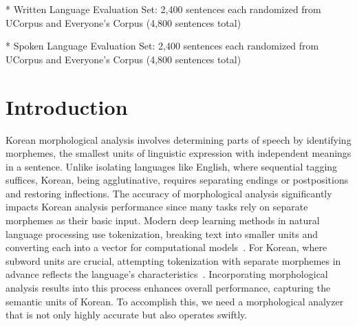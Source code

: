 \documentclass[AMS,STIX2COL]{WileyNJD-v2}
\begin{document}
\begin{table}[ht]
\begin{tabular*}{500pt}{@{\extracolsep\fill}cccD{.}{.}{3}c@{\extracolsep\fill}}
            \bottomrule
        \end{tabular*}
        \begin{tablenotes}
            \footnotesize
            \item\hspace{2mm} * Written Language Evaluation Set: 2,400 sentences each randomized from UCorpus and Everyone's Corpus (4,800 sentences total)
            \item\hspace{2mm} * Spoken Language Evaluation Set: 2,400 sentences each randomized from UCorpus and Everyone's Corpus (4,800 sentences total)
        \end{tablenotes}
    \end{table}

    \section{Introduction}\label{sec:intro}

    Korean morphological analysis involves determining parts of speech by identifying morphemes, the smallest units of linguistic expression with independent meanings in a sentence.
    Unlike isolating languages like English, where sequential tagging suffices, Korean, being agglutinative, requires separating endings or postpositions and restoring inflections.
    The accuracy of morphological analysis significantly impacts Korean analysis performance since many tasks rely on separate morphemes as their basic input.
    Modern deep learning methods in natural language processing use tokenization, breaking text into smaller units and converting each into a vector for computational models~\cite{Mikolov2013}.
    For Korean, where subword units are crucial, attempting tokenization with separate morphemes in advance reflects the language's characteristics~\cite{SongHJ2021}.
    Incorporating morphological analysis results into this process enhances overall performance, capturing the semantic units of Korean.
    To accomplish this, we need a morphological analyzer that is not only highly accurate but also operates swiftly.
\end{document}
